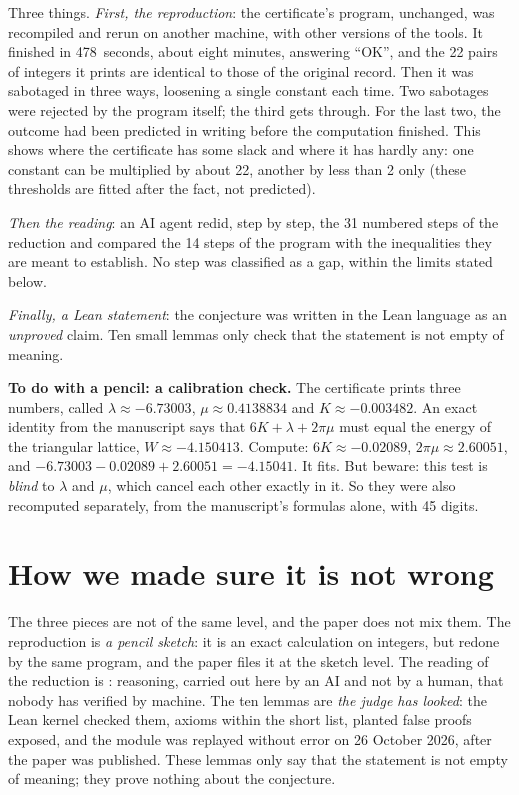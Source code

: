Three things. \emph{First, the reproduction}: the certificate's program, unchanged, was
recompiled and rerun on another machine, with other versions of the tools. It finished in
478~seconds, about eight minutes, answering ``OK'', and the 22 pairs of integers it prints are
identical to those of the original record. Then it was sabotaged in three ways, loosening a
single constant each time. Two sabotages were rejected by the program itself; the third gets
through. For the last two, the outcome had been predicted in writing before the computation
finished. This shows where the certificate has some slack and where it has hardly any: one
constant can be multiplied by about 22, another by less than 2 only (these thresholds are fitted
after the fact, not predicted).

\emph{Then the reading}: an AI agent redid, step by step, the 31 numbered steps of the
reduction and compared the 14 steps of the program with the inequalities they are meant to
establish. No step was classified as a gap, within the limits stated below.

\emph{Finally, a Lean statement}: the conjecture was written in the Lean language as an
\emph{unproved} claim. Ten small lemmas only check that the statement is not empty of meaning.

\begin{encadre}
\textbf{To do with a pencil: a calibration check.} The certificate prints three numbers, called
$\lambda\approx-6.73003$, $\mu\approx0.4138834$ and $K\approx-0.003482$. An exact identity from
the manuscript says that $6K+\lambda+2\pi\mu$ must equal the energy of the triangular lattice,
$W\approx-4.150413$. Compute: $6K\approx-0.02089$, $2\pi\mu\approx2.60051$, and
$-6.73003-0.02089+2.60051=-4.15041$. It fits. But beware: this test is \emph{blind} to
$\lambda$ and $\mu$, which cancel each other exactly in it. So they were also recomputed
separately, from the manuscript's formulas alone, with 45 digits.
\end{encadre}

\section*{How we made sure it is not wrong}

The three pieces are not of the same level, and the paper does not mix them.
The reproduction is  \emph{a pencil sketch}: it is an exact calculation on integers,
but redone by the same program, and the paper files it at the sketch level. The reading of the
reduction is : reasoning, carried out here by an AI and not by a human, that nobody has
verified by machine. The ten lemmas are  \emph{the judge has looked}: the Lean kernel checked them, axioms
within the short list, planted false proofs exposed, and the module was replayed without error on
26 October 2026, after the paper was published. These lemmas only say that the
statement is not empty of meaning; they prove nothing about the conjecture.

